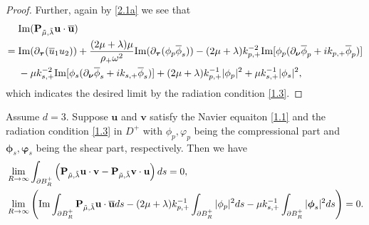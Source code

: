 \documentclass[final,reqno]{siamltex}
\newcommand{\om}{\omega}
\newcommand{\pa}{\partial}
\newcommand{\ov}{\overline}
\newcommand{\I}{{\rm Im}}
\begin{document}
\begin{proof}
	Further, again by \eqref{2.1a} we see that 
	  \begin{align*}
	  	&\I(\mathbf{P}_{\tilde{\mu},\tilde{\lambda}}\mathbf{u}\cdot\mathbf{\ov u}) \\
	  =\;&\I(\pa_{\boldsymbol{\tau}}(\ov u_1u_2))+\frac{(2\mu+\lambda)\mu}{\rho_+\om^2}\I(\pa_{\boldsymbol{\tau}}(\phi_p\ov\phi_s))-(2\mu+\lambda)k_{p,+}^{-2}\I[\phi_p(\pa_{\boldsymbol{\nu}}\ov\phi_p+ik_{p,+}\ov\phi_p)] \\
	  &-\mu k_{s,+}^{-2}\I[\phi_s(\pa_{\boldsymbol{\nu}}\ov\phi_s+ik_{s,+}\ov\phi_s)]+(2\mu+\lambda)k_{p,+}^{-1}|\phi_p|^2+\mu k_{s,+}^{-1}|\phi_s|^2, 
	  \end{align*}
	which indicates the desired limit by the radiation condition \eqref{1.3}. 
\end{proof}
\begin{theorem}\label{thm2.5a}
	Assume $d=3$. Suppose $\mathbf{u}$ and $\mathbf{v}$ satisfy the Navier equaiton \eqref{1.1} and the radiation condition \eqref{1.3} in $D^+$ with $\phi_p,\varphi_p$ being the compressional part and $\boldsymbol{\phi}_s,\boldsymbol{\varphi}_s$ being the shear part, respectively. Then we have 
	\begin{align*}
	&\lim\limits_{R\rightarrow\infty}\int_{\pa B_R^+}\left(\mathbf{P}_{\tilde{\mu},\tilde{\lambda}}\mathbf{u}\cdot\mathbf{v}-\mathbf{P}_{\tilde{\mu},\tilde{\lambda}}\mathbf{v}\cdot\mathbf{u}\right)ds=0, \\
	&\lim\limits_{R\rightarrow\infty}\left(\I\int_{\pa B_R^+}\mathbf{P}_{\tilde{\mu},\tilde{\lambda}}\mathbf{u}\cdot\mathbf{\ov u}ds-(2\mu+\lambda)k_{p,+}^{-1}\int_{\pa B_R^+}|\phi_p|^2ds-\mu k_{s,+}^{-1}\int_{\pa B_R^+}|\boldsymbol{\phi}_s|^2ds\right)=0. 
	\end{align*}
\end{theorem}
\end{document}
